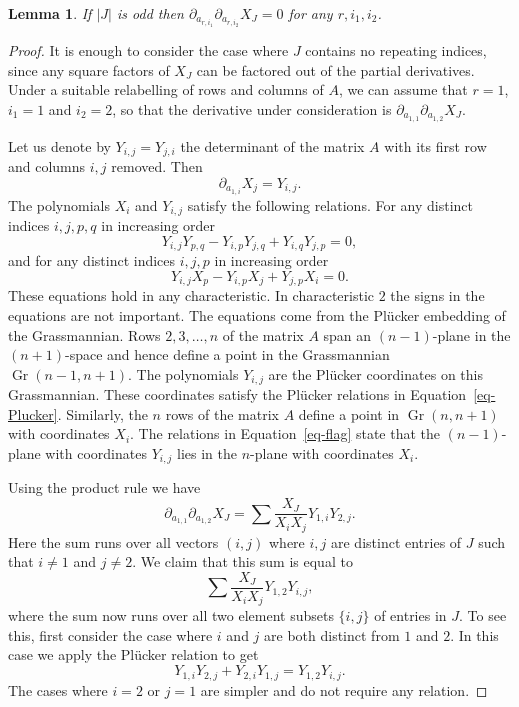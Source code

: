 \documentclass[10pt]{article}
\newtheorem{lemma}[theorem]{Lemma}
\theoremstyle{definition}
\newcommand{\Gr}{\operatorname{Gr}}
\renewcommand{\a}[1]{a_{#1}}
\begin{document}
\begin{lemma} \label{lem-2deriv}
If $|J|$ is odd then $\partial_{\a{r, i_1}}  \partial_{\a{r, i_2}} X_J = 0$  for any $r, i_1, i_2$.
\end{lemma}

\begin{proof}
  It is enough to consider the case where $J$ contains no repeating indices, since any square factors of $X_J$ can be factored out of the partial derivatives. Under a suitable relabelling of rows and columns of $A$, we can assume that $r=1$, $i_1 = 1$ and $i_2 = 2$, so that the derivative under consideration is $\partial_{\a{1, 1}} \partial_{\a{1, 2}}  X_J$.
  
 Let us denote by $Y_{i,j} = Y_{j,i}$ the determinant of the matrix $A$ with its first row and columns $i,j$ removed. Then
 \[ \partial_{\a{1, i}} X_j = Y_{i,j}.\]
 The polynomials $X_i$ and $Y_{i,j}$ satisfy the following relations. For any distinct indices $i,j,p,q$ in increasing order
 \begin{equation} \label{eq-Plucker}
 Y_{i,j} Y_{p,q} - Y_{i,p} Y_{j,q} + Y_{i,q} Y_{j,p} = 0,
 \end{equation}
 and for any distinct indices $i,j,p$ in increasing order
 \begin{equation} \label{eq-flag}
 Y_{i,j} X_p - Y_{i,p} X_{j} + Y_{j,p} X_{i} = 0.
 \end{equation}
 These equations hold in any characteristic. In characteristic $2$ the signs in the equations are not important.
 The equations come from the Pl\"ucker embedding of the Grassmannian. Rows $2,3,\ldots,n$ of the  matrix $A$ span an $(n-1)$-plane in the $(n+1)$-space and hence define a point in the Grassmannian $\Gr(n-1, n+1)$. The polynomials $Y_{i,j}$ are the Pl\"ucker coordinates on this Grassmannian. These coordinates satisfy the Pl\"ucker relations in Equation~\eqref{eq-Plucker}. Similarly, the $n$ rows of the matrix $A$ define a point in $\Gr(n,n+1)$ with coordinates $X_i$. The relations in Equation~\eqref{eq-flag}  state that the $(n-1)$-plane with coordinates $Y_{i,j}$ lies in the $n$-plane with coordinates $X_i$.
 
Using the product rule we have
\[ \partial_{\a{1, 1}}  \partial_{\a{1, 2}} X_J = \sum \frac{X_J}{X_{i}X_{j}} Y_{1,i} Y_{2,j}.\]
Here the sum runs over all vectors $(i,j)$ where $i,j$ are distinct entries of $J$ such that $i\neq 1$ and $j\neq 2$. We claim that this sum is equal to 
\[ \sum \frac{X_J}{X_{i}X_{j}} Y_{1,2} Y_{i,j},\]
  where the sum now runs over all two element subsets $\{i,j\}$ of entries in $J$. To see this, first consider the case where $i$ and $j$ are both distinct from $1$ and $2$. In this case we apply the Pl\"ucker relation to get 
 \[  Y_{1,i} Y_{2,j} + Y_{2,i} Y_{1,j}= Y_{1,2} Y_{i,j}.\]
 The cases where $i=2$ or $j=1$ are simpler and do not require any relation.
 

\end{proof}
\end{document}
